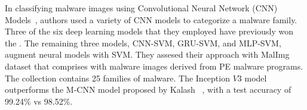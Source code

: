 \documentclass[pdflatex,sn-mathphys]{sn-jnl}%
\begin{document}

In classifying malware images using Convolutional Neural Network (CNN) Models~\cite{28}, authors used a variety of CNN models to categorize a malware family. Three of the six deep learning models that they employed have previously won the . The remaining three models, CNN-SVM, GRU-SVM, and MLP-SVM, augment neural models with SVM. They assesed their approach with MalImg~\cite{10} dataset that comprises with malware images derived from PE malware programs. The collection contains 25 families of malware. The Inception $V3$ model outperforms the M-CNN model proposed by Kalash~\cite{07} , with a test accuracy of 99.24\% vs 98.52\%.
\end{document}
